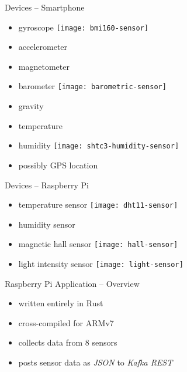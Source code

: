 \documentclass[aspectratio=1610]{beamer}
\begin{document}
  \begin{frame}{Devices -- Smartphone}
    \begin{itemize}
      \item gyroscope
            \hspace*{2em}
            \texttt{[image: bmi160-sensor]}
      \item accelerometer
      \item magnetometer
      \item barometer
            \hspace*{2em}
            \texttt{[image: barometric-sensor]}
      \item gravity
      \item temperature
      \item humidity
            \hspace*{2em}
            \texttt{[image: shtc3-humidity-sensor]}
      \item possibly GPS location
    \end{itemize}
  \end{frame}

  \begin{frame}{Devices -- Raspberry Pi}
    \begin{itemize}
      \item temperature sensor
            \hspace*{2em}
            \texttt{[image: dht11-sensor]}
      \item humidity sensor
      \item magnetic hall sensor
            \hspace*{2em}
            \texttt{[image: hall-sensor]}
      \item light intensity sensor
            \hspace*{2em}
            \texttt{[image: light-sensor]}
    \end{itemize}
  \end{frame}

  \begin{frame}{Raspberry Pi Application -- Overview}
    \begin{itemize}
      \item written entirely in Rust
      \item cross-compiled for ARMv7
      \item collects data from 8 sensors
      \item posts sensor data as \textit{JSON} to \textit{Kafka REST}
    \end{itemize}
  \end{frame}
\end{document}
